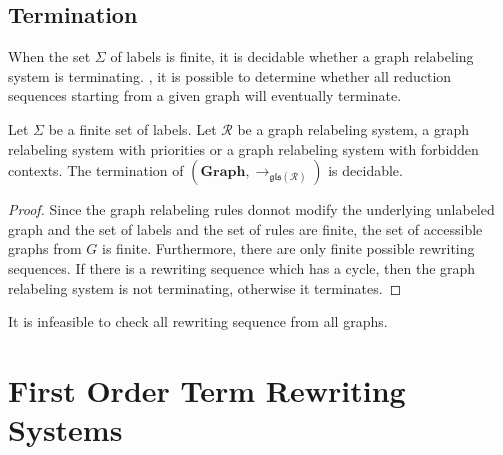       
       
    \section{Termination}
    \color{red}
      When the set $\Sigma$ of labels is finite, it is decidable whether a graph relabeling system is terminating.
    , it is possible to determine whether all reduction sequences starting from a given graph will eventually terminate. 
    
    \begin{proposition}
      Let $\Sigma$ be a finite set of labels.  Let $\mathcal{R}$ be a graph relabeling system, a graph relabeling system with priorities or a graph relabeling system with forbidden contexts. The termination of $(\textbf{Graph}, \mathop{\to} _{\mathfrak{gls(\mathcal{R})}})$ is decidable.
      \end{proposition}
      \begin{proof}
         Since the graph relabeling rules donnot modify the underlying unlabeled graph and the set of labels and the set of rules are finite, the set of accessible graphs from $G$ is finite. Furthermore, there are only finite possible rewriting sequences. If there is a rewriting sequence which has a cycle, then the graph relabeling system is not terminating, otherwise it terminates.
      \end{proof}
    
    \begin{remark}
      It is infeasible to check all rewriting sequence from all graphs.
    \end{remark}
    \color{black}

\chapter{First Order Term Rewriting Systems}
    \label{sec:trs} 
    
